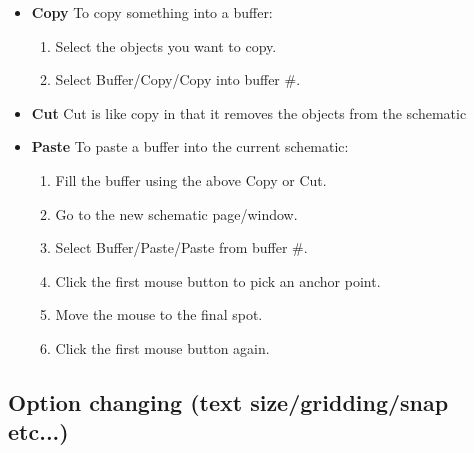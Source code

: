 \documentclass{article}
\begin{document}
\begin{itemize}
\item {\bf Copy} To copy something into a buffer:
\begin{enumerate}
\item Select the objects you want to copy.
\item Select Buffer/Copy/Copy into buffer \#.
\end{enumerate}

\item {\bf Cut} Cut is like copy in that it removes the objects from
  the schematic
  
\item {\bf Paste} To paste a buffer into the current schematic:

\begin{enumerate}
\item Fill the buffer using the above Copy or Cut.
\item Go to the new schematic page/window.
\item Select Buffer/Paste/Paste from buffer \#.
\item Click the first mouse button to pick an anchor point.
\item Move the mouse to the final spot.
\item Click the first mouse button again.
\end{enumerate}

\end{itemize}

\subsection{Option changing (text size/gridding/snap etc...)}
\end{document}

